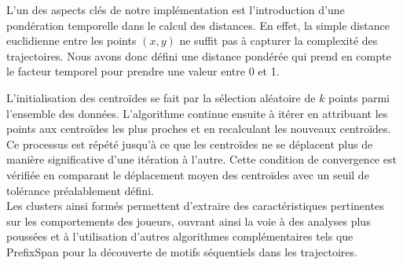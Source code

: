 \documentclass{article}
\begin{document}
        L’un des aspects clés de notre implémentation est l’introduction d’une pondération temporelle dans le calcul des distances. En effet, la simple distance euclidienne entre les points $(x, y)$ ne suffit pas à capturer la complexité des trajectoires. Nous avons donc défini une distance pondérée qui prend en compte le facteur temporel pour prendre une valeur entre 0 et 1.
    

        L’initialisation des centroïdes se fait par la sélection aléatoire de $k$ points parmi l’ensemble des données.
        L’algorithme continue ensuite à itérer en attribuant les points aux centroïdes les plus proches et en recalculant les nouveaux centroïdes. Ce processus est répété jusqu’à ce que les centroïdes ne se déplacent plus de manière significative d’une itération à l’autre. Cette condition de convergence est vérifiée en comparant le déplacement moyen des centroïdes avec un seuil de tolérance préalablement défini.\\
        Les clusters ainsi formés permettent d’extraire des caractéristiques pertinentes sur les comportements des joueurs, ouvrant ainsi la voie à des analyses plus poussées et à l’utilisation d’autres algorithmes complémentaires tels que PrefixSpan pour la découverte de motifs séquentiels dans les trajectoires.



\end{document}
